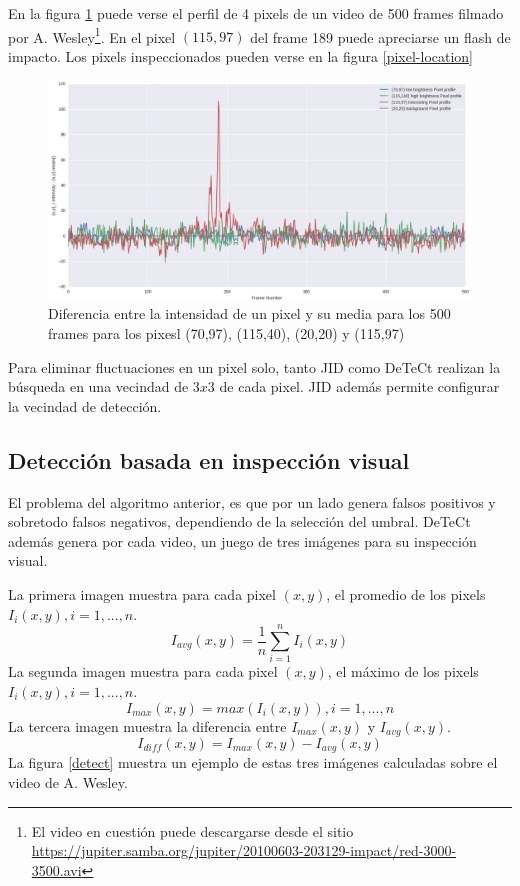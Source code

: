 \documentclass[a4paper,10pt]{article}
\begin{document}
En la figura \ref{pixel-plot} puede verse el perfil de 4 pixels de un video de 500 frames 
filmado por A. Wesley\footnote{El video en cuestión puede descargarse desde el sitio 
\url{https://jupiter.samba.org/jupiter/20100603-203129-impact/red-3000-3500.avi}}. En el 
pixel $(115,97)$ del frame 189 puede apreciarse un flash de impacto. Los pixels 
inspeccionados pueden verse en la figura \ref{pixel-location}
\begin{figure}[H]
\includegraphics[scale=0.35]{pixprof2.png}
\caption{Diferencia entre la intensidad de un pixel y su media para los 500 frames para 
los pixesl (70,97), (115,40), (20,20) y (115,97) }
\label{pixel-plot}
\end{figure}
Para eliminar fluctuaciones en un pixel solo, tanto JID como DeTeCt realizan la búsqueda 
en una vecindad de $3x3$ de cada pixel. JID además permite configurar la vecindad de 
detección.

\subsection{Detección basada en inspección visual}
El problema del algoritmo anterior, es que por un lado genera falsos positivos y 
sobretodo falsos negativos, dependiendo de la selección del umbral. DeTeCt además genera 
por cada video, un juego de tres imágenes para su inspección visual.

La primera imagen muestra para cada pixel $(x,y)$, el promedio de los pixels $I_i(x,y), 
i= 1,...,n$.
$$I_{avg}(x,y) =  \frac{1}{n}\sum_{i=1}^{n}I_i(x,y)$$
La segunda imagen muestra para cada pixel $(x,y)$, el máximo de los pixels $I_i(x,y), 
i= 1,...,n$.
$$I_{max}(x,y) =  max(I_i(x,y)), i=1,...,n$$
La tercera imagen muestra la diferencia entre $I_{max}(x,y)$ y $I_{avg}(x,y)$.
$$I_{diff}(x,y) = I_{max}(x,y) - I_{avg}(x,y)$$
La figura \ref{detect} muestra un ejemplo de estas tres imágenes calculadas sobre el 
video de A. Wesley.
\end{document}
